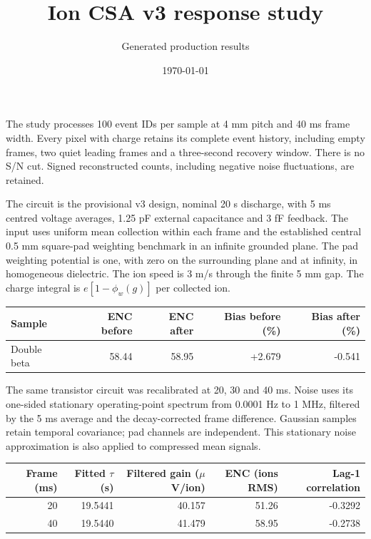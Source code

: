 \documentclass[10pt,a4paper]{article}
\title{Ion CSA v3 response study}
\date{\today}
\author{Generated production results}
\begin{document}
\maketitle

The study processes 100 event IDs per sample at 4 mm pitch
and 40 ms frame width. Every pixel with charge retains its
complete event history, including empty frames, two quiet leading frames and a
three-second recovery window. There is no S/N cut. Signed reconstructed counts,
including negative noise fluctuations, are retained.

The circuit is the provisional v3 design, nominal 20 s discharge, with 5 ms
centred voltage averages, 1.25 pF external capacitance and 3 fF feedback. The input
uses uniform mean collection within each frame and the established central
0.5 mm square-pad weighting benchmark in an infinite grounded plane. The pad
weighting potential is one, with zero on the surrounding plane and at infinity,
in homogeneous dielectric. The ion speed is 3 m/s through the finite 5 mm gap.
The charge integral is $e[1-\phi_w(g)]$ per collected ion.

\begin{center}\small\begin{tabular}{lrrrr}\toprule Sample & ENC before & ENC after & Bias before (\%) & Bias after (\%)\\\midrule
Double beta & 58.44 & 58.95 & +2.679 & -0.541 \\\bottomrule\end{tabular}\end{center}

The same transistor circuit was recalibrated at 20, 30 and 40 ms. Noise uses its
one-sided stationary operating-point spectrum from 0.0001 Hz to 1 MHz, filtered
by the 5 ms average and the decay-corrected frame difference. Gaussian samples
retain temporal covariance; pad channels are independent. This stationary noise
approximation is also applied to compressed mean signals.
\begin{center}\begin{tabular}{rrrrr}\toprule
Frame (ms) & Fitted $\tau$ (s) & Filtered gain ($\mu$V/ion) & ENC (ions RMS) & Lag-1 correlation\\\midrule
20 & 19.5441 & 40.157 & 51.26 & -0.3292 \\
40 & 19.5440 & 41.479 & 58.95 & -0.2738 \\
\bottomrule\end{tabular}\end{center}
\end{document}
